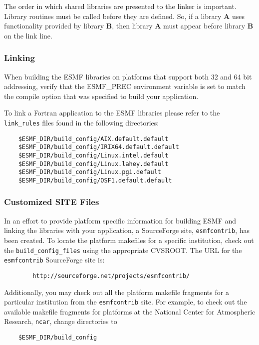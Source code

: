 The order in which shared libraries are presented to 
the linker is important. Library routines must be called before they are 
defined. So, if a library {\bf A} uses functionality provided by library 
{\bf B}, then library {\bf A} must appear before library {\bf B} on the 
link line. 

\subsubsection{Linking}

When building the ESMF libraries on platforms that support both
32 and 64 bit addressing, verify that the ESMF\_PREC environment 
variable is set to match the compile option that was specified 
to build your application.

To link a Fortran application to the ESMF libraries please 
refer to the {\tt link\_rules} files found in the following directories:

\begin{verbatim}
	$ESMF_DIR/build_config/AIX.default.default
	$ESMF_DIR/build_config/IRIX64.default.default
	$ESMF_DIR/build_config/Linux.intel.default
	$ESMF_DIR/build_config/Linux.lahey.default
	$ESMF_DIR/build_config/Linux.pgi.default
	$ESMF_DIR/build_config/OSF1.default.default
\end{verbatim}


\subsubsection{Customized SITE Files}

In an effort to provide platform specific information for building ESMF 
and linking the libraries with your application, a SourceForge 
site, {\tt esmfcontrib}, has been created.
To locate the platform makefiles for a specific institution, check out 
the {\tt build\_config\_files} using the appropriate CVSROOT.
The URL for the {\tt esmfcontrib} SourceForge site is:

\begin{verbatim}
        http://sourceforge.net/projects/esmfcontrib/
\end{verbatim}

Additionally, you may check out all the platform makefile fragments 
for a particular institution from the {\tt esmfcontrib} site. For example, 
to check out the available makefile fragments for platforms at the
National Center for Atmospheric Research, {\tt ncar}, change directories to

\begin{verbatim}
 	$ESMF_DIR/build_config
\end{verbatim}

